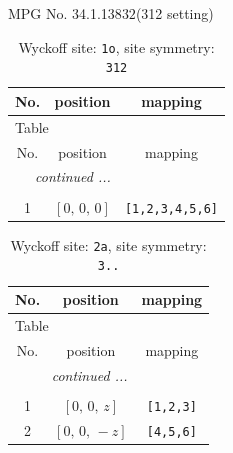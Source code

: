 \documentclass[fleqn,8pt]{jsarticle}
\begin{document}
\setcounter{MaxMatrixCols}{32}

\renewcommand{\tablename}{Table~}
\renewcommand{\figurename}{Figure~}
\begin{center}
\LARGE
MPG No. 34.1.138\quad$32$\quad(312 setting)
\end{center}
\renewcommand{\arraystretch}{1.2}
\begin{longtable}{ccc}
\caption{Wyckoff site: {\tt 1o}, site symmetry: {\tt 312}}
 \\
 \hline \hline
No. & position & mapping \\ \hline \endfirsthead

\multicolumn{2}{l}{\tablename\ \thetable{}} \\
 \hline \hline
No. & position & mapping \\ \hline \endhead

 \hline \hline
\multicolumn{2}{r}{\footnotesize\it continued ...} \\ \endfoot

 \hline \hline
\multicolumn{2}{r}{} \\ \endlastfoot

1 & $\left[ 0,\, 0,\, 0 \right]$ & {\tt [1,2,3,4,5,6]} \\
\end{longtable}
\renewcommand{\arraystretch}{1.2}
\begin{longtable}{ccc}
\caption{Wyckoff site: {\tt 2a}, site symmetry: {\tt 3..}}
 \\
 \hline \hline
No. & position & mapping \\ \hline \endfirsthead

\multicolumn{2}{l}{\tablename\ \thetable{}} \\
 \hline \hline
No. & position & mapping \\ \hline \endhead

 \hline \hline
\multicolumn{2}{r}{\footnotesize\it continued ...} \\ \endfoot

 \hline \hline
\multicolumn{2}{r}{} \\ \endlastfoot

1 & $\left[ 0,\, 0,\, z \right]$ & {\tt [1,2,3]} \\ \hline
2 & $\left[ 0,\, 0,\, - z \right]$ & {\tt [4,5,6]} \\
\end{longtable}
\renewcommand{\arraystretch}{1.2}
\end{document}
